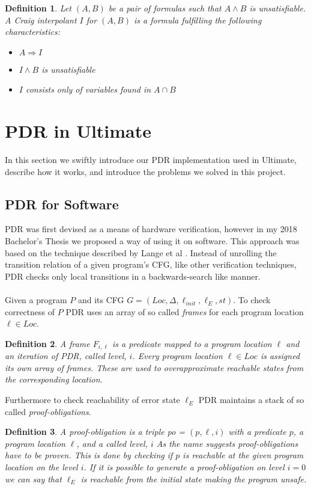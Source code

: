 \documentclass{article}
\newtheorem{mydef}{Definition}
\begin{document}
	\begin{mydef}
		Let $(A, B)$ be a pair of formulas such that $A \land B$ is unsatisfiable. A Craig interpolant $I$ for $(A, B)$ is a formula fulfilling the following characteristics:
		\begin{itemize}
			\item $A \Rightarrow I$
			\item $I \land B$ is unsatisfiable
			\item $I$ consists only of variables found in $A \cap B$
		\end{itemize}
	\end{mydef}

	\pagebreak
	
	\section{PDR in Ultimate}
	In this section we swiftly introduce our PDR implementation used in Ultimate, describe how it works, and introduce the problems we solved in this project.
	
	\subsection{PDR for Software}
	PDR was first devised as a means of hardware verification, however in my 2018 Bachelor's Thesis we proposed a way of using it on software. This approach was based on the technique described by Lange et al \cite{DBLP:conf/fmcad/0001NN15}.
	Instead of unrolling the transition relation of a given program's CFG, like other verification techniques, PDR checks only local transitions in a backwards-search like manner. \\ \\
	Given a program $P$ and its CFG  $G = (Loc, \Delta, \ell_{init}, \ell_E, st)$. To check correctness of $P$ PDR uses an array of so called \textsl{frames} for each program location $\ell \in Loc$. 
	\begin{mydef}
		A frame $F_{i,\ell}$ is a predicate mapped to a program location $\ell$ and an iteration of PDR, called level, $i$.
		Every program location $\ell \in Loc$ is assigned its own array of frames. These are used to overapproximate reachable states from the corresponding location.
	\end{mydef}
	Furthermore to check reachability of error state $\ell_E$ PDR maintains a stack of so called \textsl{proof-obligations}.
	\begin{mydef}
		A proof-obligation is a triple po = $(p, \ell, i)$ with a predicate $p$, a program location $\ell$, and a called level, $i$
		As the name suggests proof-obligations have to be proven. This is done by checking if $p$ is reachable at the given program location on the level $i$. If it is possible to generate a proof-obligation on level $i = 0$ we can say that $\ell_E$ is reachable from the initial state making the program unsafe.
	\end{mydef}
\end{document}
